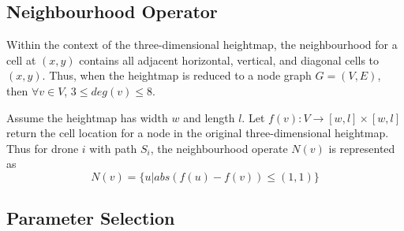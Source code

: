 \documentclass[conference]{IEEEtran}
\begin{document}
\subsection{Neighbourhood Operator}
Within the context of the three-dimensional heightmap, the neighbourhood for a cell at $(x, y)$ contains all adjacent horizontal, vertical, and diagonal cells to $(x, y)$. Thus, when the heightmap is reduced to a node graph $G = (V, E)$, then $\forall v \in V$, $3 \leq deg(v) \leq 8$.

Assume the heightmap has width $w$ and length $l$. Let $f(v) : V \rightarrow [w, l] \times [w, l]$ return the cell location for a node in the original three-dimensional heightmap. Thus for drone $i$ with path $S_i$, the neighbourhood operate $N(v)$ is represented as
\begin{equation} \label{eq:neighbourhood}
N(v) = \{ u | abs(f(u) - f(v)) \leq (1, 1) \}
\end{equation}


\subsection{Parameter Selection}
\end{document}
